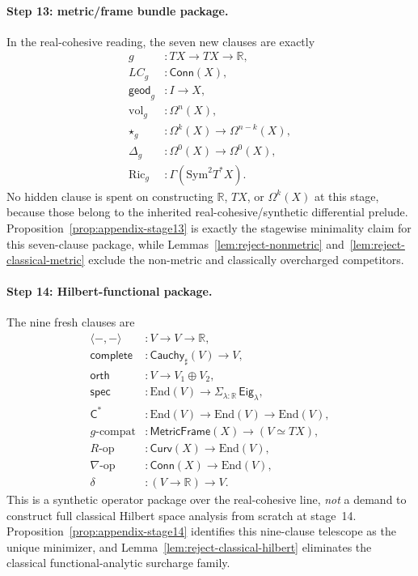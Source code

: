 \documentclass{lmcs}
\theoremstyle{plain}
\theoremstyle{definition}
\theoremstyle{remark}
\newcommand{\R}{\ensuremath{\mathbb{R}}}
\newcommand{\sharpm}{\ensuremath{\mathbin{\sharp}}}
\begin{document}
\paragraph{Step 13: metric/frame bundle package.}
In the real-cohesive reading, the seven new clauses are exactly
\[
\begin{aligned}
g &: TX\to TX\to \R,\\
LC_g &:\mathsf{Conn}(X),\\
\mathsf{geod}_g &: I \to X,\\
\mathrm{vol}_g &:\Omega^n(X),\\
\star_g &:\Omega^k(X)\to \Omega^{n-k}(X),\\
\Delta_g &:\Omega^0(X)\to \Omega^0(X),\\
\mathrm{Ric}_g &:\Gamma(\mathrm{Sym}^2 T^\ast X).
\end{aligned}
\]
No hidden clause is spent on constructing $\R$, $TX$, or $\Omega^k(X)$ at this stage, because those belong to the inherited real-cohesive/synthetic differential prelude. Proposition~\ref{prop:appendix-stage13} is exactly the stagewise minimality claim for this seven-clause package, while Lemmas~\ref{lem:reject-nonmetric} and~\ref{lem:reject-classical-metric} exclude the non-metric and classically overcharged competitors.

\paragraph{Step 14: Hilbert-functional package.}
The nine fresh clauses are
\[
\begin{aligned}
\langle-,-\rangle &: V\to V\to \R,\\
\mathsf{complete} &: \mathsf{Cauchy}_{\sharpm}(V)\to V,\\
\mathsf{orth} &: V\to V_1\oplus V_2,\\
\mathsf{spec} &: \mathrm{End}(V)\to \Sigma_{\lambda:\R}\,\mathsf{Eig}_\lambda,\\
\mathsf{C^\ast} &: \mathrm{End}(V)\to \mathrm{End}(V)\to \mathrm{End}(V),\\
g\text{-compat} &: \mathsf{MetricFrame}(X)\to (V\simeq TX),\\
R\text{-op} &: \mathsf{Curv}(X)\to \mathrm{End}(V),\\
\nabla\text{-op} &: \mathsf{Conn}(X)\to \mathrm{End}(V),\\
\delta &: (V\to \R)\to V.
\end{aligned}
\]
This is a synthetic operator package over the real-cohesive line, \emph{not} a demand to construct full classical Hilbert space analysis from scratch at stage~14. Proposition~\ref{prop:appendix-stage14} identifies this nine-clause telescope as the unique minimizer, and Lemma~\ref{lem:reject-classical-hilbert} eliminates the classical functional-analytic surcharge family.
\end{document}
